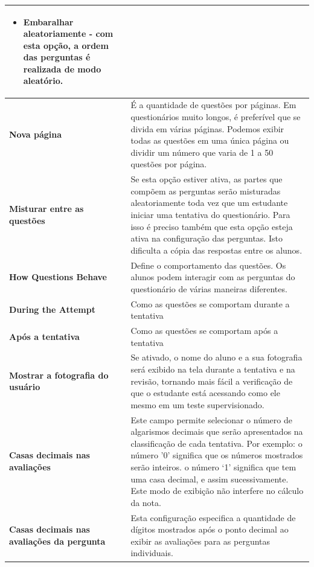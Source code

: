 \begin{longtable}{p{6cm}|p{9cm}}
\begin{itemize}
\item Embaralhar aleatoriamente - com esta opção, a ordem das perguntas é realizada de modo aleatório.
\end{itemize}\\\hline
    \textbf{Nova página}                                               & É a quantidade de questões por páginas. Em questionários muito longos, é preferível que se divida em várias páginas. Podemos exibir todas as questões em uma única página ou dividir um número que varia de 1 a 50 questões por página.\\\hline
    \textbf{Misturar entre as questões}                                &Se esta opção estiver ativa, as partes que compõem as perguntas serão misturadas aleatoriamente toda vez que um estudante iniciar uma tentativa do questionário. Para isso é preciso também que esta opção esteja ativa na configuração das perguntas. Isto dificulta a cópia das respostas entre os alunos.\\\hline
    \textbf{How Questions Behave}                                      &Define o comportamento das questões. Os alunos podem interagir com as perguntas do questionário de várias maneiras diferentes.\\\hline
    \textbf{During the Attempt}                                        &Como as questões se comportam durante a tentativa\\\hline
    \textbf{Após a tentativa}                                          &Como as questões se comportam após a tentativa\\\hline
    \textbf{Mostrar a fotografia do usuário}                           &Se ativado, o nome do aluno e a sua fotografia será exibido na tela durante a tentativa e na revisão, tornando mais fácil a verificação de que o estudante está acessando como ele mesmo em um teste supervisionado.\\\hline
    \textbf{Casas decimais nas avaliações}                             &Este campo permite selecionar o número de algarismos decimais que serão apresentados na classificação de cada tentativa. Por exemplo: o número '0' significa que os números mostrados serão inteiros. o número ‘1’ significa que tem uma casa decimal, e assim sucessivamente. Este modo de exibição não interfere no cálculo da nota.\\\hline
    \textbf{Casas decimais nas avaliações da pergunta}                 & Esta configuração especifica a quantidade de dígitos mostrados após o ponto decimal ao exibir as avaliações para as perguntas individuais.\\\hline

\end{longtable}
